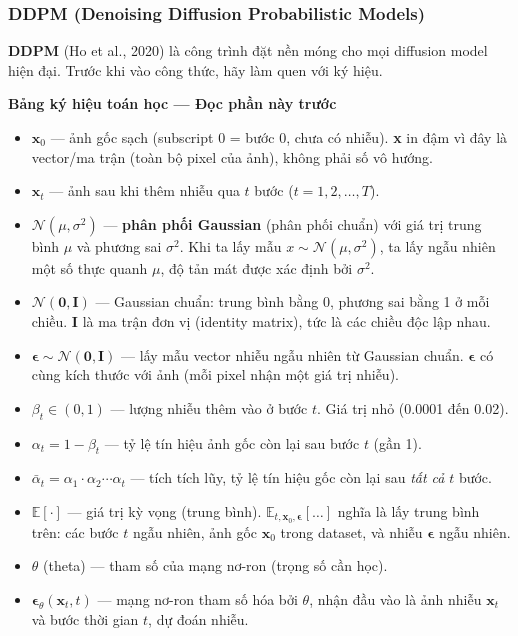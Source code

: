 \subsubsection{DDPM (Denoising Diffusion Probabilistic Models)}
\label{subsubsec:ddpm}

\textbf{DDPM} \cite{Ho2020} (Ho et al., 2020) là công trình đặt nền móng cho mọi diffusion model hiện đại. Trước khi vào công thức, hãy làm quen với ký hiệu.

\begin{mdframed}[style=infobox]
\textbf{Bảng ký hiệu toán học --- Đọc phần này trước}

\begin{itemize}
    \item $\mathbf{x}_0$ --- ảnh gốc sạch (subscript 0 = bước 0, chưa có nhiễu). \textbf{x} in đậm vì đây là vector/ma trận (toàn bộ pixel của ảnh), không phải số vô hướng.
    \item $\mathbf{x}_t$ --- ảnh sau khi thêm nhiễu qua $t$ bước ($t = 1, 2, \ldots, T$).
    \item $\mathcal{N}(\mu, \sigma^2)$ --- \textbf{phân phối Gaussian} (phân phối chuẩn) với giá trị trung bình $\mu$ và phương sai $\sigma^2$. Khi ta lấy mẫu $x \sim \mathcal{N}(\mu, \sigma^2)$, ta lấy ngẫu nhiên một số thực quanh $\mu$, độ tản mát được xác định bởi $\sigma^2$.
    \item $\mathcal{N}(\mathbf{0}, \mathbf{I})$ --- Gaussian chuẩn: trung bình bằng 0, phương sai bằng 1 ở mỗi chiều. $\mathbf{I}$ là ma trận đơn vị (identity matrix), tức là các chiều độc lập nhau.
    \item $\boldsymbol{\epsilon} \sim \mathcal{N}(\mathbf{0}, \mathbf{I})$ --- lấy mẫu vector nhiễu ngẫu nhiên từ Gaussian chuẩn. $\boldsymbol{\epsilon}$ có cùng kích thước với ảnh (mỗi pixel nhận một giá trị nhiễu).
    \item $\beta_t \in (0, 1)$ --- lượng nhiễu thêm vào ở bước $t$. Giá trị nhỏ (0.0001 đến 0.02).
    \item $\alpha_t = 1 - \beta_t$ --- tỷ lệ tín hiệu ảnh gốc còn lại sau bước $t$ (gần 1).
    \item $\bar{\alpha}_t = \alpha_1 \cdot \alpha_2 \cdots \alpha_t$ --- tích tích lũy, tỷ lệ tín hiệu gốc còn lại sau \textit{tất cả} $t$ bước.
    \item $\mathbb{E}[\cdot]$ --- giá trị kỳ vọng (trung bình). $\mathbb{E}_{t, \mathbf{x}_0, \boldsymbol{\epsilon}}[\ldots]$ nghĩa là lấy trung bình trên: các bước $t$ ngẫu nhiên, ảnh gốc $\mathbf{x}_0$ trong dataset, và nhiễu $\boldsymbol{\epsilon}$ ngẫu nhiên.
    \item $\theta$ (theta) --- tham số của mạng nơ-ron (trọng số cần học).
    \item $\boldsymbol{\epsilon}_\theta(\mathbf{x}_t, t)$ --- mạng nơ-ron tham số hóa bởi $\theta$, nhận đầu vào là ảnh nhiễu $\mathbf{x}_t$ và bước thời gian $t$, dự đoán nhiễu.
\end{itemize}
\end{mdframed}

